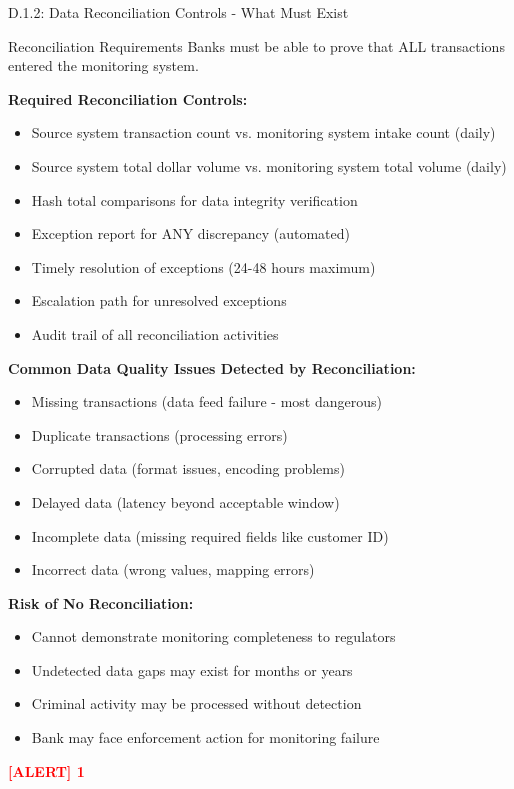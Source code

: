 \documentclass[11pt,a4paper]{beamer}
\newcommand{\redflag}[1]{\textcolor{red}{\textbf{[ALERT] 1}}}
\begin{document}
\begin{frame}{D.1.2: Data Reconciliation Controls - What Must Exist}
	\begin{block}{Reconciliation Requirements}
		Banks must be able to prove that ALL transactions entered the monitoring system.
	\end{block}
	\textbf{Required Reconciliation Controls:}
	\begin{itemize}
		\item Source system transaction count vs. monitoring system intake count (daily)
		\item Source system total dollar volume vs. monitoring system total volume (daily)
		\item Hash total comparisons for data integrity verification
		\item Exception report for ANY discrepancy (automated)
		\item Timely resolution of exceptions (24-48 hours maximum)
		\item Escalation path for unresolved exceptions
		\item Audit trail of all reconciliation activities
	\end{itemize}
	\textbf{Common Data Quality Issues Detected by Reconciliation:}
	\begin{itemize}
		\item Missing transactions (data feed failure - most dangerous)
		\item Duplicate transactions (processing errors)
		\item Corrupted data (format issues, encoding problems)
		\item Delayed data (latency beyond acceptable window)
		\item Incomplete data (missing required fields like customer ID)
		\item Incorrect data (wrong values, mapping errors)
	\end{itemize}
	\textbf{Risk of No Reconciliation:}
	\begin{itemize}
		\item Cannot demonstrate monitoring completeness to regulators
		\item Undetected data gaps may exist for months or years
		\item Criminal activity may be processed without detection
		\item Bank may face enforcement action for monitoring failure
	\end{itemize}
	\redflag{The exam frequently tests silent data failures with no error messages.}
\end{frame}
\end{document}
